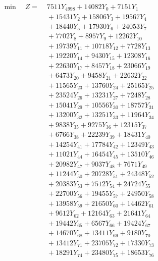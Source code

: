 \documentclass[a4paper,10pt]{article}
\begin{document}
\allowdisplaybreaks
{\small
\begin{align}
\min \quad Z = &\; 7511 Y_{4998} + 14082 Y_{0} + 7151 Y_{1} \\[0.3ex]
&\;  + 15431 Y_{2} + 15806 Y_{3} + 19567 Y_{4} \\[0.3ex]
&\;  + 18440 Y_{5} + 17930 Y_{6} + 24053 Y_{7} \\[0.3ex]
&\;  + 7702 Y_{8} + 8957 Y_{9} + 12262 Y_{10} \\[0.3ex]
&\;  + 19739 Y_{11} + 10718 Y_{12} + 7728 Y_{13} \\[0.3ex]
&\;  + 19220 Y_{14} + 9430 Y_{15} + 12308 Y_{16} \\[0.3ex]
&\;  + 22630 Y_{17} + 8457 Y_{18} + 23066 Y_{19} \\[0.3ex]
&\;  + 6473 Y_{20} + 9458 Y_{21} + 22632 Y_{22} \\[0.3ex]
&\;  + 11565 Y_{23} + 13760 Y_{24} + 25165 Y_{25} \\[0.3ex]
&\;  + 23524 Y_{26} + 13231 Y_{27} + 7248 Y_{28} \\[0.5ex]\allowbreak
&\;  + 15041 Y_{29} + 10556 Y_{30} + 18757 Y_{31} \\[0.3ex]
&\;  + 13200 Y_{32} + 13251 Y_{33} + 11964 Y_{34} \\[0.3ex]
&\;  + 9838 Y_{35} + 9275 Y_{36} + 12315 Y_{37} \\[0.3ex]
&\;  + 6766 Y_{38} + 22239 Y_{39} + 18431 Y_{40} \\[0.3ex]
&\;  + 14254 Y_{41} + 17784 Y_{42} + 12349 Y_{43} \\[0.3ex]
&\;  + 11021 Y_{44} + 16454 Y_{45} + 13510 Y_{46} \\[0.3ex]
&\;  + 20982 Y_{47} + 9037 Y_{48} + 7671 Y_{49} \\[0.3ex]
&\;  + 11244 Y_{50} + 20728 Y_{51} + 24348 Y_{52} \\[0.3ex]
&\;  + 20383 Y_{53} + 7512 Y_{54} + 24724 Y_{55} \\[0.3ex]
&\;  + 22700 Y_{56} + 19455 Y_{57} + 24950 Y_{58} \\[0.5ex]\allowbreak
&\;  + 13958 Y_{59} + 21650 Y_{60} + 14462 Y_{61} \\[0.3ex]
&\;  + 9612 Y_{62} + 12164 Y_{63} + 21641 Y_{64} \\[0.3ex]
&\;  + 19442 Y_{65} + 6567 Y_{66} + 19424 Y_{67} \\[0.3ex]
&\;  + 14670 Y_{68} + 13411 Y_{69} + 9180 Y_{70} \\[0.3ex]
&\;  + 13412 Y_{71} + 23705 Y_{72} + 17330 Y_{73} \\[0.3ex]
&\;  + 18291 Y_{74} + 23480 Y_{75} + 18653 Y_{76} \\[0.3ex]

\end{align}}
\end{document}
